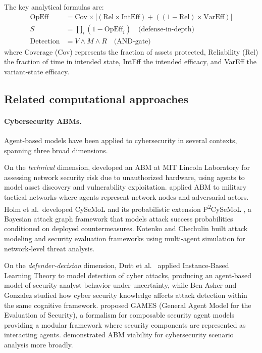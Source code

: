 \documentclass[11pt,a4paper]{article}
\begin{document}
The key analytical formulas are:
\begin{align}
    \mathrm{OpEff} &= \mathrm{Cov} \times \bigl[(\mathrm{Rel} \times \mathrm{IntEff}) + ((1-\mathrm{Rel}) \times \mathrm{VarEff})\bigr] \label{eq:opeff} \\
    S &= \prod_{i} (1 - \mathrm{OpEff}_i) \quad \text{(defense-in-depth)} \label{eq:suscept} \\
    \mathrm{Detection} &= V \wedge M \wedge R \quad \text{(AND-gate)} \label{eq:detect}
\end{align}
where Coverage (Cov) represents the fraction of assets protected, Reliability (Rel) the fraction of time in intended state, IntEff the intended efficacy, and VarEff the variant-state efficacy.

\subsection{Related computational approaches}

\paragraph{Cybersecurity ABMs.} Agent-based models have been applied to cybersecurity in several contexts, spanning three broad dimensions.

On the \emph{technical} dimension, \citet{Wagner2015} developed an ABM at MIT Lincoln Laboratory for assessing network security risk due to unauthorized hardware, using agents to model asset discovery and vulnerability exploitation. \citet{Thompson2018} applied ABM to military tactical networks where agents represent network nodes and adversarial actors. Holm et al.\ developed CySeMoL and its probabilistic extension P\textsuperscript{2}CySeMoL \citep{Holm2014}, a Bayesian attack graph framework that models attack success probabilities conditioned on deployed countermeasures. Kotenko and Chechulin \citep{Kotenko2013} built attack modeling and security evaluation frameworks using multi-agent simulation for network-level threat analysis.

On the \emph{defender-decision} dimension, Dutt et al.\ \citep{Dutt2013} applied Instance-Based Learning Theory to model detection of cyber attacks, producing an agent-based model of security analyst behavior under uncertainty, while Ben-Asher and Gonzalez \citep{BenAsher2015} studied how cyber security knowledge affects attack detection within the same cognitive framework. \citet{Rausch2018} proposed GAMES (General Agent Model for the Evaluation of Security), a formalism for composable security agent models providing a modular framework where security components are represented as interacting agents. \citet{Cernohorsky2018} demonstrated ABM viability for cybersecurity scenario analysis more broadly.
\end{document}
